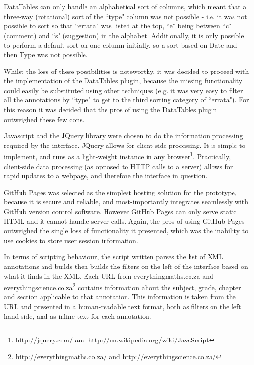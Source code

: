 DataTables can only handle an alphabetical sort of columns, which meant that a three-way (rotational) sort of the ``type" column was not possible - i.e. it was not possible to sort so that ``errata" was listed at the top, ``e" being between ``c" (comment) and ``s" (suggestion) in the alphabet. Additionally, it is only possible to perform a default sort on one column initially, so a sort based on Date and then Type was not possible.

Whilst the loss of these possibilities is noteworthy, it was decided to proceed with the implementation of the DataTables plugin, because the missing functionality could easily be substituted using other techniques (e.g. it was very easy to filter all the annotations by ``type" to get to the third sorting category of ``errata"). For this reason it was decided that the pros of using the DataTables plugin outweighed these few cons.

Javascript and the JQuery library were chosen to do the information processing required by the interface. JQuery allows for client-side processing. It is simple to implement, and runs as a light-weight instance in any browser\footnote{\href{http://jquery.com/}{http://jquery.com/} and \href{http://en.wikipedia.org/wiki/JavaScript}{http://en.wikipedia.org/wiki/JavaScript}}. Practically, client-side data processing (as opposed to HTTP calls to a server) allows for rapid updates to a webpage, and therefore the interface in question. 

GitHub Pages was selected as the simplest hosting solution for the prototype, because it is secure and reliable, and most-importantly integrates seamlessly with GitHub version control software. However GitHub Pages can only serve static HTML and it cannot handle server calls. Again, the pros of using GitHub Pages outweighed the single loss of functionality it presented, which was the inability to use cookies to store user session information. 


In terms of scripting behaviour, the script written parses the list of XML annotations and builds then builds the filters on the left of the interface based on what it finds in the XML. Each URL from everythingmaths.co.za and everythingscience.co.za\footnote{\href{http://everythingmaths.co.za/}{http://everythingmaths.co.za/} and \href{http://everythingscience.co.za/}{http://everythingscience.co.za/}} contains information about the subject, grade, chapter and section applicable to that annotation. This information is taken from the URL and presented in a human-readable text format, both as filters on the left hand side, and as inline text for each annotation. 

